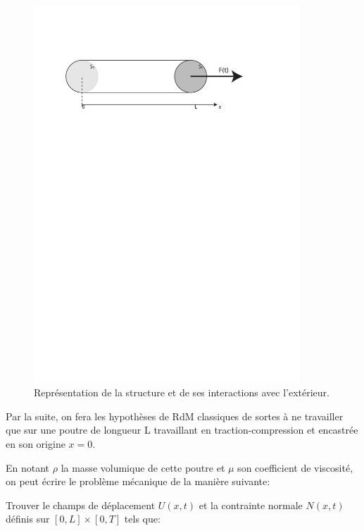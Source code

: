 \documentclass[fleqn]{article}
\begin{document}
\begin{figure}[htbp]
	\begin{center}
		\includegraphics[width=10cm]{figures/poutre_c}
		\caption{Représentation de la structure et de ses interactions avec l'extérieur.}
		\label{PbmBase}
	\end{center}
\end{figure}

Par la suite, on fera les hypothèses de RdM classiques de sortes à ne travailler que sur une poutre de longueur L travaillant en traction-compression et encastrée en son origine $x=0$.

En notant $\rho$ la masse volumique de cette poutre et $\mu$ son coefficient de viscosité, on peut écrire le problème mécanique de la manière suivante:

\begin{it} 
	Trouver le champs de déplacement $U(x,t)$ et la contrainte normale $N(x,t)$ définis sur $\left[0,L\right] \times \left[0,T \right]$ tels que:
\end{it}
\end{document}

